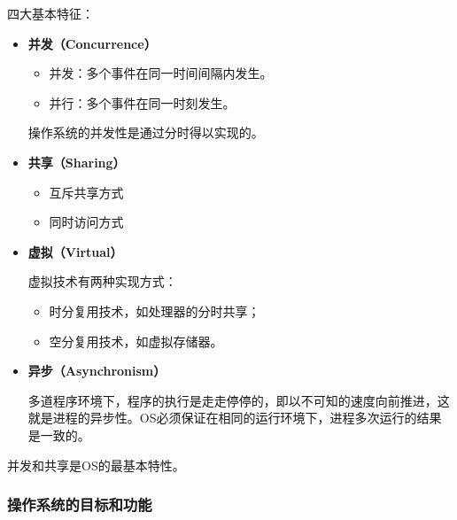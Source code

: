 \documentclass[12pt, a4paper, oneside]{ctexart}
\begin{document}
四大基本特征：
\begin{itemize}
  \item {\bf 并发（Concurrence）}
  \begin{itemize}
    \item 并发：多个事件在同一时间间隔内发生。
    \item 并行：多个事件在同一时刻发生。
  \end{itemize}
  操作系统的并发性是通过分时得以实现的。
  \item {\bf 共享（Sharing）}
  \begin{itemize}
    \item 互斥共享方式
    \item 同时访问方式
  \end{itemize}
  \item {\bf 虚拟（Virtual）}
  
  虚拟技术有两种实现方式：
  \begin{itemize}
    \item 时分复用技术，如处理器的分时共享；
    \item 空分复用技术，如虚拟存储器。
  \end{itemize}
  \item {\bf 异步（Asynchronism）}
  
  多道程序环境下，程序的执行是走走停停的，即以不可知的速度向前推进，这就是进程的异步性。OS必须保证在相同的运行环境下，进程多次运行的结果是一致的。
\end{itemize}

并发和共享是OS的最基本特性。

\subsubsection{操作系统的目标和功能}
\end{document}
